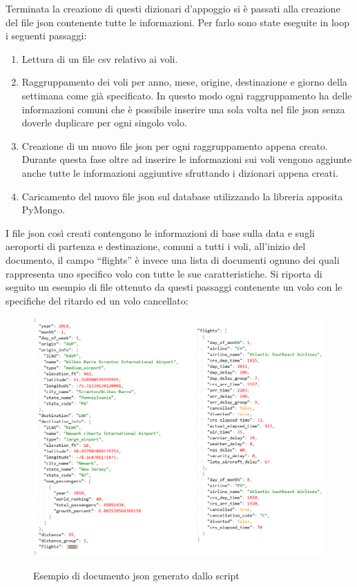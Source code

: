 \documentclass[12pt]{article}
\begin{document}
Terminata la creazione di questi dizionari d'appoggio si è passati alla creazione del file json contenente tutte le informazioni. Per farlo sono state eseguite in loop i seguenti passaggi:
\begin{enumerate}
    \item Lettura di un file csv relativo ai voli.
    \item Raggruppamento dei voli per anno, mese, origine, destinazione e giorno della settimana come già specificato. In questo modo ogni raggruppamento ha delle informazioni comuni che è possibile inserire una sola volta nel file json senza doverle duplicare per ogni singolo volo.
    \item Creazione di un nuovo file json per ogni raggruppamento appena creato. Durante questa fase oltre ad inserire le informazioni sui voli vengono aggiunte anche tutte le informazioni aggiuntive sfruttando i dizionari appena creati.
    \item Caricamento del nuovo file json sul database utilizzando la libreria apposita PyMongo.
\end{enumerate}
I file json così creati contengono le informazioni di base sulla data e sugli aeroporti di partenza e destinazione, comuni a tutti i voli, all'inizio del documento, il campo ``flights'' è invece una lista di documenti ognuno dei quali rappresenta uno specifico volo con tutte le sue caratteristiche. 
Si riporta di seguito un esempio di file ottenuto da questi passaggi contenente un volo con le specifiche del ritardo ed un volo cancellato: 
\begin{figure}[H]
  \hspace{-20pt}
  \includegraphics[scale = 0.7]{img/dataMan/JsonSampleDocument.png}\\
  \caption{Esempio di documento json generato dallo script}
\end{figure}
\end{document}

